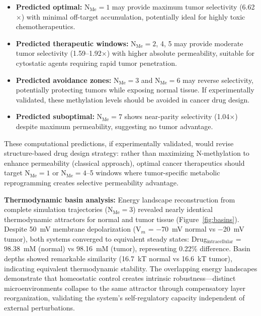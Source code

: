 \documentclass[10pt,letterpaper]{article}
\begin{document}
\begin{itemize}
\item \textbf{Predicted optimal:} N$_{\text{Me}} = 1$ may provide maximum tumor selectivity (6.62$\times$) with minimal off-target accumulation, potentially ideal for highly toxic chemotherapeutics.

\item \textbf{Predicted therapeutic windows:} N$_{\text{Me}} = 2$, 4, 5 may provide moderate tumor selectivity (1.59--1.92$\times$) with higher absolute permeability, suitable for cytostatic agents requiring rapid tumor penetration.

\item \textbf{Predicted avoidance zones:} N$_{\text{Me}} = 3$ and N$_{\text{Me}} = 6$ may reverse selectivity, potentially protecting tumors while exposing normal tissue. If experimentally validated, these methylation levels should be avoided in cancer drug design.

\item \textbf{Predicted suboptimal:} N$_{\text{Me}} = 7$ shows near-parity selectivity (1.04$\times$) despite maximum permeability, suggesting no tumor advantage.
\end{itemize}

These computational predictions, if experimentally validated, would revise structure-based drug design strategy: rather than maximizing N-methylation to enhance permeability (classical approach), optimal cancer therapeutics should target N$_{\text{Me}} = 1$ or N$_{\text{Me}} = 4$--5 windows where tumor-specific metabolic reprogramming creates selective permeability advantage.

\textbf{Thermodynamic basin analysis:} Energy landscape reconstruction from complete simulation trajectories (N$_{\text{Me}} = 3$) revealed nearly identical thermodynamic attractors for normal and tumor tissue (Figure~\ref{fig:basins}). Despite 50~mV membrane depolarization (V$_m$ = $-$70~mV normal vs $-$20~mV tumor), both systems converged to equivalent steady states: Drug$_{\text{intracellular}}$ = 98.38~mM (normal) vs 98.16~mM (tumor), representing 0.22\% difference. Basin depths showed remarkable similarity (16.7~kT normal vs 16.6~kT tumor), indicating equivalent thermodynamic stability. The overlapping energy landscapes demonstrate that homeostatic control creates intrinsic robustness---distinct microenvironments collapse to the same attractor through compensatory layer reorganization, validating the system's self-regulatory capacity independent of external perturbations.
\end{document}
